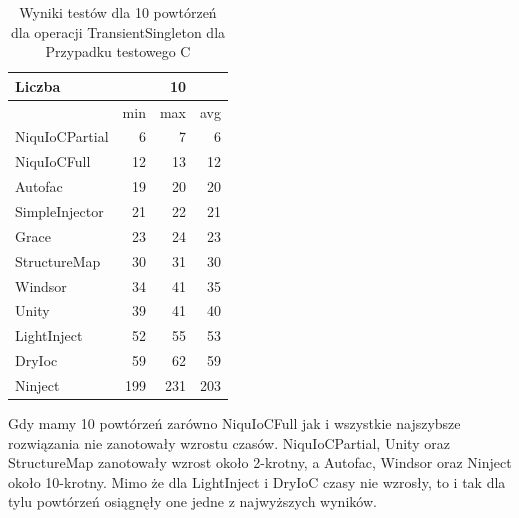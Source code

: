 \documentclass[12pt]{article}
\begin{document}
\begin{table}[H]
\captionsetup{belowskip=0pt,aboveskip=0pt}
\begin{center}
\begin{small}
	\begin{tabular}{ | l | r r r | }
    		\hline
Liczba & & 10 & \\ \hline
 & min & max & avg \\ \hline
NiquIoCPartial & 6 & 7 & 6 \\ \hline
NiquIoCFull & 12 & 13 & 12 \\ \hline
Autofac & 19 & 20 & 20 \\ \hline
SimpleInjector & 21 & 22 & 21 \\ \hline
Grace & 23 & 24 & 23 \\ \hline
StructureMap & 30 & 31 & 30 \\ \hline
Windsor & 34 & 41 & 35 \\ \hline
Unity & 39 & 41 & 40 \\ \hline
LightInject & 52 & 55 & 53 \\ \hline
DryIoc & 59 & 62 & 59 \\ \hline
Ninject & 199 & 231 & 203 \\ \hline
  	\end{tabular}
\end{small}
\end{center}
\caption{Wyniki testów dla 10 powtórzeń dla operacji TransientSingleton dla Przypadku testowego C}
\label{TestCaseC_TransientSingleton10}
\end{table}
Gdy mamy 10 powtórzeń zarówno NiquIoCFull jak i wszystkie najszybsze rozwiązania nie zanotowały wzrostu czasów. NiquIoCPartial, Unity oraz StructureMap zanotowały wzrost około 2-krotny, a Autofac, Windsor oraz Ninject około 10-krotny. Mimo że dla LightInject i DryIoC czasy nie wzrosły, to i tak dla tylu powtórzeń osiągnęły one jedne z najwyższych wyników.
\\ \\
\end{document}
